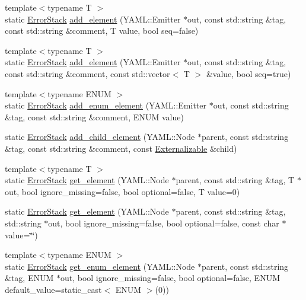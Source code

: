 \begin{DoxyCompactItemize}
\item 
{\footnotesize template$<$typename T $>$ }\\static \hyperlink{classalps_1_1ErrorStack}{Error\+Stack} \hyperlink{structalps_1_1Externalizable_a61f858f84debb03b04172d1a4b1f8fd2}{add\+\_\+element} (Y\+A\+M\+L\+::\+Emitter $\ast$out, const std\+::string \&tag, const std\+::string \&comment, T value, bool seq=false)
\item 
{\footnotesize template$<$typename T $>$ }\\static \hyperlink{classalps_1_1ErrorStack}{Error\+Stack} \hyperlink{structalps_1_1Externalizable_a8cffba39c5316b4adbf46e4a9244d2d8}{add\+\_\+element} (Y\+A\+M\+L\+::\+Emitter $\ast$out, const std\+::string \&tag, const std\+::string \&comment, const std\+::vector$<$ T $>$ \&value, bool seq=true)
\item 
{\footnotesize template$<$typename E\+N\+UM $>$ }\\static \hyperlink{classalps_1_1ErrorStack}{Error\+Stack} \hyperlink{structalps_1_1Externalizable_a6a684727a7e58fe41fba41b54ee95e7c}{add\+\_\+enum\+\_\+element} (Y\+A\+M\+L\+::\+Emitter $\ast$out, const std\+::string \&tag, const std\+::string \&comment, E\+N\+UM value)
\item 
static \hyperlink{classalps_1_1ErrorStack}{Error\+Stack} \hyperlink{structalps_1_1Externalizable_acf463dfeffb23bd455eaf868d2e20de6}{add\+\_\+child\+\_\+element} (Y\+A\+M\+L\+::\+Node $\ast$parent, const std\+::string \&tag, const std\+::string \&comment, const \hyperlink{structalps_1_1Externalizable}{Externalizable} \&child)
\item 
{\footnotesize template$<$typename T $>$ }\\static \hyperlink{classalps_1_1ErrorStack}{Error\+Stack} \hyperlink{structalps_1_1Externalizable_a880beff849c59fe09e4be608901ca5e3}{get\+\_\+element} (Y\+A\+M\+L\+::\+Node $\ast$parent, const std\+::string \&tag, T $\ast$out, bool ignore\+\_\+missing=false, bool optional=false, T value=0)
\item 
static \hyperlink{classalps_1_1ErrorStack}{Error\+Stack} \hyperlink{structalps_1_1Externalizable_a53b7384d8b707667d22cf293a4307a73}{get\+\_\+element} (Y\+A\+M\+L\+::\+Node $\ast$parent, const std\+::string \&tag, std\+::string $\ast$out, bool ignore\+\_\+missing=false, bool optional=false, const char $\ast$value=\char`\"{}\char`\"{})
\item 
{\footnotesize template$<$typename E\+N\+UM $>$ }\\static \hyperlink{classalps_1_1ErrorStack}{Error\+Stack} \hyperlink{structalps_1_1Externalizable_a88cbbc7033b72b78fea4dd6fc8ca1402}{get\+\_\+enum\+\_\+element} (Y\+A\+M\+L\+::\+Node $\ast$parent, const std\+::string \&tag, E\+N\+UM $\ast$out, bool ignore\+\_\+missing=false, bool optional=false, E\+N\+UM default\+\_\+value=static\+\_\+cast$<$ E\+N\+UM $>$(0))

\end{DoxyCompactItemize}
